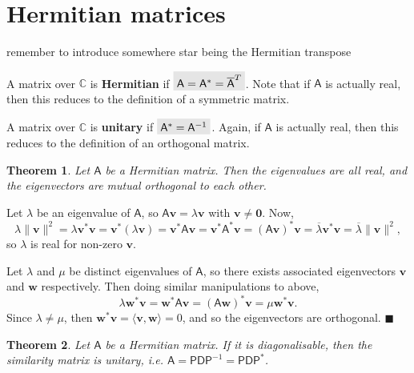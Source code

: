 \documentclass[letter-paper]{tufte-book}
\newtheorem{theorem}{\color{pastel-blue}Theorem}[section]
\newenvironment{proof}[1][Proof]{\begin{trivlist}
\item[\hskip \labelsep {\bfseries #1}]}{\end{trivlist}}
\newcommand{\inner}[2]{\langle #1, #2\rangle}
\newcommand{\As}{{\mathsf{A}}}
\newcommand{\Ds}{{\mathsf{D}}}
\newcommand{\Ps}{{\mathsf{P}}}
\newcommand{\Ob}{{\boldsymbol{0}}}
\newcommand{\vb}{{\boldsymbol{v}}}
\newcommand{\wb}{{\boldsymbol{w}}}
\newcommand{\qed}{\hfill$\blacksquare$}
\newcommand{\highlight}[1]{\mathchoice%
  {\colorbox{black!10}{$\displaystyle#1$}}%
  {\colorbox{black!10}{$\textstyle#1$}}%
  {\colorbox{black!10}{$\scriptstyle#1$}}%
  {\colorbox{black!10}{$\scriptscriptstyle#1$}}}%
\begin{document}
\section{Hermitian matrices}\label{sec:hermitian}

{\color{red}remember to introduce somewhere star being the Hermitian transpose}

A matrix over $\mathbb{C}$ is \textbf{Hermitian} if $\highlight{\As = \As^* =
\overline{\As}^T}$. Note that if $\As$ is actually real, then this reduces to
the definition of a symmetric matrix.

A matrix over $\mathbb{C}$ is \textbf{unitary} if $\highlight{\As^* =
\As^{-1}}$.
Again, if $\As$ is actually real, then this reduces to the definition of an
orthogonal matrix.

\begin{theorem}
  Let $\As$ be a Hermitian matrix. Then the eigenvalues are all real, and the
  eigenvectors are mutual orthogonal to each other.
\end{theorem}

\begin{proof}
  Let $\lambda$ be an eigenvalue of $\As$, so $\As\vb=\lambda\vb$ with
  $\vb\neq\Ob$. Now,
  \begin{equation*}
    \lambda\|\vb\|^2 = \lambda\vb^*\vb = \vb^* (\lambda\vb) = \vb^* \As\vb = \vb^* \As^*\vb = (\As\vb)^* \vb = \overline{\lambda}\vb^*\vb = \overline{\lambda}\|\vb\|^2,
  \end{equation*}
  so $\lambda$ is real for non-zero $\vb$.
  
  Let $\lambda$ and $\mu$ be distinct eigenvalues of $\As$, so there exists
  associated eigenvectors $\vb$ and $\wb$ respectively. Then doing similar
  manipulations to above,
  \begin{equation*}
    \lambda\wb^*\vb = \wb^* \As\vb = (\As\wb)^* \vb = \mu\wb^*\vb.
  \end{equation*}
  Since $\lambda\neq\mu$, then $\wb^*\vb = \inner{\vb}{\wb} = 0$, and so
  the eigenvectors are orthogonal. \qed
\end{proof}

\begin{theorem}
  Let $\As$ be a Hermitian matrix. If it is diagonalisable, then the similarity
  matrix is unitary, i.e. $\As = \Ps \Ds \Ps^{-1} = \Ps \Ds \Ps^*$.
\end{theorem}
\end{document}
